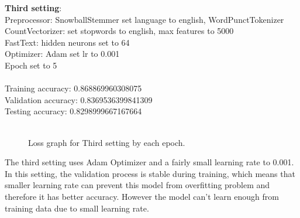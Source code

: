 \documentclass{article} %
\begin{document}
\newpage
\noindent
\textbf{Third setting}:\\
Preprocessor: SnowballStemmer set language to english, WordPunctTokenizer\\
CountVectorizer: set stopwords to english, max features to 5000\\
FastText: hidden neurons set to 64\\
Optimizer: Adam set lr to 0.001\\
Epoch set to 5\\
\\
\noindent
Training accuracy: 0.868869960308075\\
Validation accuracy: 0.8369536399841309\\
Testing accuracy: 0.8298999667167664\\
\begin{figure}[htp]
    \centering
    \\
Loss graph for Third setting by each epoch.   
    \end{figure}

The third setting uses Adam Optimizer and a fairly small learning rate to 0.001. In this setting, the validation process is stable during training, which means that smaller learning rate can prevent this model from overfitting problem and therefore it has better accuracy. However the model can't learn enough from training data due to small learning rate.
\end{document}
